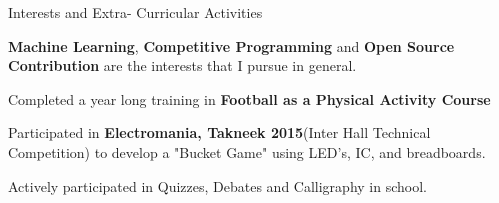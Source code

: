 \documentclass{resume} %
\begin{document}
\begin{rSection}{\hspace{.5cm} Interests and Extra- Curricular Activities} \itemsep -3pt
\item \textbf{Machine Learning}, \textbf{Competitive Programming} and \textbf{Open Source Contribution} are the interests that I pursue in general. 
\item Completed a year long training in \textbf{Football as a Physical Activity Course} 
\item Participated in \textbf{Electromania, Takneek 2015}(Inter Hall Technical Competition) to develop a "Bucket Game" using LED's, IC, and breadboards.
\item Actively participated in Quizzes, Debates and Calligraphy in school.


\end{rSection}
\end{document}
